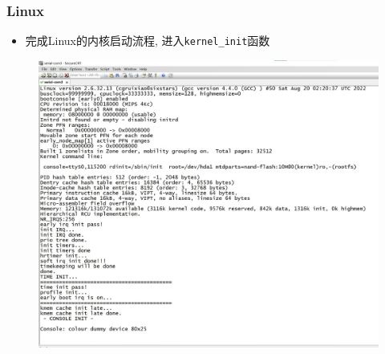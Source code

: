 \documentclass{beamer}
\begin{document}
\begin{frame}
    \frametitle{Linux}

    \begin{minipage}[c]{0.4\linewidth}
        \begin{itemize}
        \item 完成Linux的内核启动流程, 进入\texttt{kernel\_init}函数
        \end{itemize}
    \end{minipage}
    \hfill
    \begin{minipage}{0.5\linewidth}
        \begin{figure}
            \centering
            \includegraphics[width=1.1\textwidth]{pic/Linux.jpg}
        \end{figure}
    \end{minipage}

\end{frame}
\end{document}
